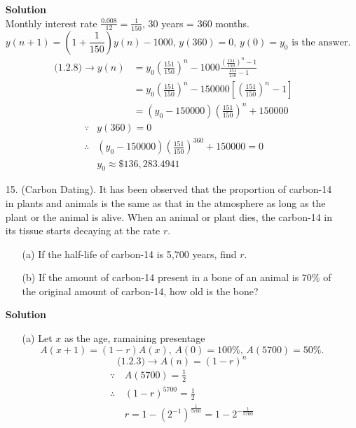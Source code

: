\begin{enumerate}
        \textbf{Solution} \\
        Monthly interest rate $\frac{0.008}{12}=\frac{1}{150}$, 30 years = 360 months. \\
        $$y(n+1)=(1+\frac{1}{150})y(n)-1000,\,y(360)=0,\,y(0)=y_0\text{ is the answer.}$$
        \begin{align*}
            \text{(1.2.8)}\to y(n) & =y_0\left(\frac{151}{150}\right)^n -1000\frac{(\frac{151}{150})^n-1}{\frac{151}{150}-1} \\
                                   & =y_0\left(\frac{151}{150}\right)^n -150000\left[\left(\frac{151}{150}\right)^n-1\right] \\
                                   & =(y_0-150000)\left(\frac{151}{150}\right)^n +150000
        \end{align*}
        \begin{align*}
            \because & y(360)=0 \\
            \therefore & (y_0-150000)\left(\frac{151}{150}\right)^{360}+150000=0 \\
            & y_0\approx \$136,283.4941
        \end{align*}
    \item[15.] (Carbon Dating). It has been observed that the proportion of carbon-14 in plants and animals is the same as that in the atmosphere as long as the plant or the animal is alive. When an animal or plant dies, the carbon-14 in its tissue starts decaying at the rate $r$.
        \begin{itemize}
            \item[(a)] If the half-life of carbon-14 is 5,700 years, find $r$.
            \item[(b)] If the amount of carbon-14 present in a bone of an animal is 70\% of the original amount of carbon-14, how old is the bone?
        \end{itemize}
        \textbf{Solution}
        \begin{itemize}
            \item[(a)] Let $x$ as the age, ramaining presentage
                $$A(x+1)=(1-r)A(x),\,A(0)=100\%,\,A(5700)=50\%.$$
                 $$\text{(1.2.3)}\to A(n)=(1-r)^n$$
                 \begin{align*}
                    \because\, & A(5700)=\frac{1}{2} \\
                    \therefore\, & (1-r)^{5700}=\frac{1}{2} \\
                               & r=1-(2^{-1})^\frac{1}{5700}=1-2^{-\frac{1}{5700}}

\end{align*}
\end{itemize}
\end{enumerate}
